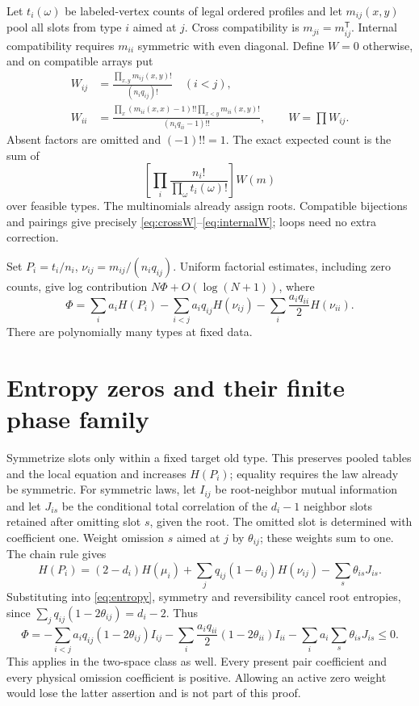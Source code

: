 \documentclass[11pt]{article}
\begin{document}
Let $t_i(\omega)$ be labeled-vertex counts of legal ordered profiles and let $m_{ij}(x,y)$ pool all slots from type $i$ aimed at $j$. Cross compatibility is $m_{ji}=m_{ij}^{\mathsf T}$. Internal compatibility requires $m_{ii}$ symmetric with even diagonal. Define $W=0$ otherwise, and on compatible arrays put
\begin{align}
 W_{ij}&=\frac{\prod_{x,y}m_{ij}(x,y)!}{(n_iq_{ij})!}\quad(i<j),\label{eq:crossW}\\
 W_{ii}&=\frac{\prod_x(m_{ii}(x,x)-1)!!\prod_{x<y}m_{ii}(x,y)!}
 {(n_iq_{ii}-1)!!},\qquad W=\prod W_{ij}.\label{eq:internalW}
\end{align}
Absent factors are omitted and $(-1)!!=1$. The exact expected count is the sum of
\begin{equation}\label{eq:typecount}
 \left[\prod_i\frac{n_i!}{\prod_\omega t_i(\omega)!}\right]W(m)
\end{equation}
over feasible types. The multinomials already assign roots. Compatible bijections and pairings give precisely \eqref{eq:crossW}--\eqref{eq:internalW}; loops need no extra correction.

Set $P_i=t_i/n_i$, $\nu_{ij}=m_{ij}/(n_iq_{ij})$. Uniform factorial estimates, including zero counts, give log contribution $N\Phi+O(\log(N+1))$, where
\begin{equation}\label{eq:entropy}
 \Phi=\sum_i a_iH(P_i)-\sum_{i<j}a_iq_{ij}H(\nu_{ij})
                         -\sum_i\frac{a_iq_{ii}}2H(\nu_{ii}).
\end{equation}
There are polynomially many types at fixed data.

\section{Entropy zeros and their finite phase family}
Symmetrize slots only within a fixed target old type. This preserves pooled tables and the local equation and increases $H(P_i)$; equality requires the law already be symmetric. For symmetric laws, let $I_{ij}$ be root-neighbor mutual information and let $J_{is}$ be the conditional total correlation of the $d_i-1$ neighbor slots retained after omitting slot $s$, given the root. The omitted slot is determined with coefficient one. Weight omission $s$ aimed at $j$ by $\theta_{ij}$; these weights sum to one. The chain rule gives
\[
 H(P_i)=(2-d_i)H(\mu_i)
       +\sum_jq_{ij}(1-\theta_{ij})H(\nu_{ij})
       -\sum_s\theta_{is}J_{is}.
\]
Substituting into \eqref{eq:entropy}, symmetry and reversibility cancel root entropies, since $\sum_jq_{ij}(1-2\theta_{ij})=d_i-2$. Thus
\begin{equation}\label{eq:allslot}
 \Phi=-\sum_{i<j}a_iq_{ij}(1-2\theta_{ij})I_{ij}
      -\sum_i\frac{a_iq_{ii}}2(1-2\theta_{ii})I_{ii}
      -\sum_i a_i\sum_s\theta_{is}J_{is}\le0.
\end{equation}
This applies in the two-space class as well. Every present pair coefficient and every physical omission coefficient is positive. Allowing an active zero weight would lose the latter assertion and is not part of this proof.
\end{document}
